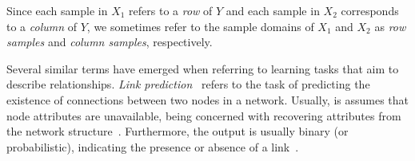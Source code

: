 Since each sample in $X_1$ refers to a \emph{row} of $Y$ and each sample in
$X_2$ corresponds to a \emph{column} of $Y$, we sometimes refer to the sample
domains of $X_1$ and $X_2$ as \emph{row samples} and \emph{column samples},
respectively.







Several similar terms have emerged when referring to learning tasks that aim to describe relationships.
%
%
\emph{Link prediction}~\cite{lu2011link,zhou2021progresses} refers to the task of predicting the existence of connections between two nodes in a network. Usually, is assumes that node attributes are unavailable, being concerned with recovering attributes from the network structure~\cite{lu2011link}. Furthermore, the output is usually binary (or probabilistic), indicating the presence or absence of a link~\cite{lu2011link}.
%

